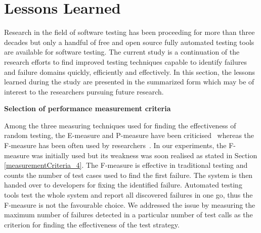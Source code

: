 \section{Lessons Learned}
Research in the field of software testing has been proceeding for more than three decades but only a handful of free and open source fully automated testing tools are available for software testing. The current study is a continuation of the research efforts to find improved testing techniques capable to identify failures and failure domains quickly, efficiently and effectively. In this section, the lessons learned during the study are presented in the summarized form which may be of interest to the researchers pursuing future research.\\

  
    

\newpage






\textbf{Selection of performance measurement criteria}

Among the three measuring techniques used for finding the effectiveness of random testing, the E-measure and P-measure have been criticised~\cite{chen2005adaptive} whereas the F-measure has been often used by researchers~\cite{chen2004statistical, chen1996expected}. In our experiments, the F-measure was initially used but its weakness was soon realised as stated in Section \ref{measurementCriteria_4}. The F-measure is effective in traditional testing and counts the number of test cases used to find the first failure. The system is then handed over to developers for fixing the identified failure. Automated testing tools test the whole system and report all discovered failures in one go, thus the F-measure is not the favourable choice. We addressed the issue by measuring the maximum number of failures detected in a particular number of test calls as the criterion for finding the effectiveness of the test strategy.\\


